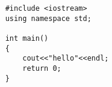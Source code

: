 \documentclass{article}
\begin{document}
	\lstset{language=C}
	\begin{lstlisting}
	#include <iostream>
	using namespace std;
	
	int main()
	{
		cout<<"hello"<<endl;
		return 0;
	}
	\end{lstlisting}
\end{document}
